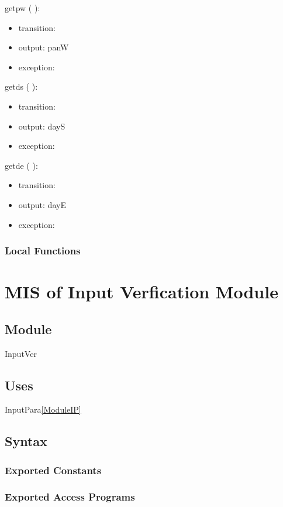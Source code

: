 \documentclass[12pt, titlepage]{article}
\begin{document}
\noindent  getpw ( ):
\begin{itemize}
\item transition: 
\item output: panW
\item exception: 
\end{itemize}

\noindent  getds ( ):
\begin{itemize}
\item transition: 
\item output: dayS
\item exception: 
\end{itemize}

\noindent  getde ( ):
\begin{itemize}
\item transition: 
\item output: dayE
\item exception: 
\end{itemize}

\subsubsection{Local Functions}

\section{MIS of Input Verfication Module} \label{ModuleIV} 

\subsection{Module}
InputVer

\subsection{Uses}
InputPara\ref{ModuleIP}

\subsection{Syntax}

\subsubsection{Exported Constants}


\subsubsection{Exported Access Programs}
\end{document}
